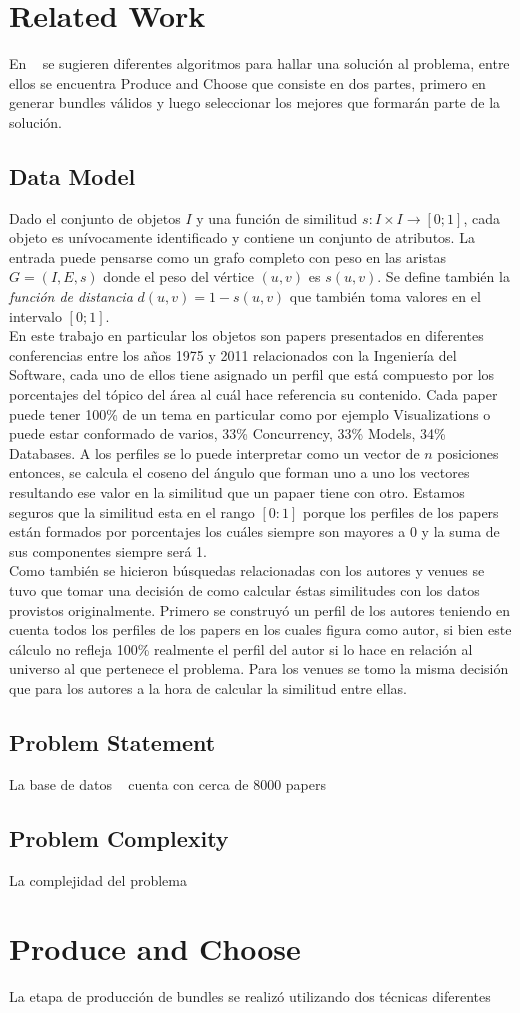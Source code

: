 \section{Related Work}
En ~\cite{compositeRetrival} se sugieren diferentes algoritmos para hallar una solución al problema, entre ellos se encuentra Produce and Choose que consiste en dos partes, primero en generar bundles válidos y luego seleccionar los mejores que formarán parte de la solución.
\subsection{Data Model}
Dado el conjunto de objetos $I$ y una función de similitud $ s: I \times I \rightarrow [0;1]$, cada objeto es unívocamente identificado y contiene un conjunto de atributos. La entrada puede pensarse como un grafo completo con peso en las aristas $G=(I,E,s)$ donde el peso del vértice $(u,v)$ es $s(u,v)$. Se define también la \textit{función de distancia} $d(u,v) = 1 - s(u,v)$ que también toma valores en el intervalo $[0;1]$.\\
En este trabajo en particular los objetos son papers presentados en diferentes conferencias entre los años 1975 y 2011 relacionados con la Ingeniería del Software, cada uno de ellos tiene asignado un perfil que está compuesto por los porcentajes del tópico del área al cuál hace referencia su contenido. Cada paper puede tener 100\% de un tema en particular como por ejemplo Visualizations o puede estar conformado de varios, 33\% Concurrency, 33\% Models, 34\% Databases. A los perfiles se lo puede interpretar como un vector de $n$ posiciones entonces, se calcula el coseno del ángulo que forman uno a uno los vectores resultando ese valor en la similitud que un papaer tiene con otro. Estamos seguros que la similitud esta en el rango $[0:1]$ porque los perfiles de los papers están formados por porcentajes los cuáles siempre son mayores a 0 y la suma de sus componentes siempre será 1.\\
Como también se hicieron búsquedas relacionadas con los autores y venues se tuvo que tomar una decisión de como calcular éstas similitudes con los datos provistos originalmente. Primero se construyó un perfil de los autores teniendo en cuenta todos los perfiles de los papers en los cuales figura como autor, si bien este cálculo no refleja 100\% realmente el perfil del autor si lo hace en relación al universo al que pertenece el problema. Para los venues se tomo la misma decisión que para los autores a la hora de calcular la similitud entre ellas.
\subsection{Problem Statement}
La base de datos ~\cite{dataDrive} cuenta con cerca de 8000 papers 
\subsection{Problem Complexity}
La complejidad del problema
\section{Produce and Choose}
La etapa de producción de bundles se realizó utilizando dos técnicas diferentes
